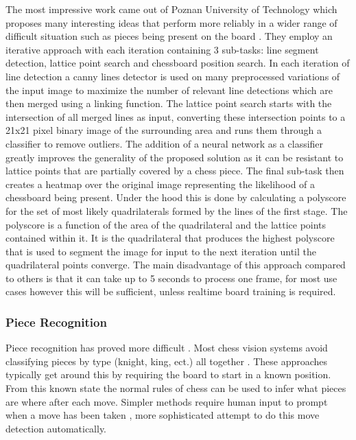 The most impressive work came out of Poznan University of Technology which proposes many interesting ideas that perform more 
reliably in a wider range of difficult situation such as pieces being present on the board \cite{}.  They employ an iterative 
approach with each iteration containing 3 sub-tasks: line segment detection, lattice point search and chessboard position search.
In each iteration of line detection a canny lines detector \cite{} is used on many preprocessed variations of the input image 
to maximize the number of relevant line detections which are then merged using a linking function. The lattice point search starts with 
the intersection of all merged lines as input, converting these intersection points to a 21x21 pixel binary image of the surrounding area and 
runs them through a classifier to remove outliers.  The addition of a neural network as a classifier greatly improves 
the generality of the proposed solution as it can be resistant to lattice points that are partially covered by a chess piece.
The final sub-task then creates a heatmap over the original image representing the likelihood of a chessboard being present.  
Under the hood this is done by calculating a polyscore for the set of most likely quadrilaterals formed by the lines of the first stage.
The polyscore is a function of the area of the quadrilateral and the lattice points contained within it.
It is the quadrilateral that produces the highest polyscore that is used to segment the image for input to the next iteration until the quadrilateral
points converge.  The main disadvantage of this approach compared to others is that it can take up to 5 seconds to process one frame, 
for most use cases however this will be sufficient, unless realtime board training is required.

\subsubsection{Piece Recognition}

Piece recognition has proved more difficult \cite{}.  Most chess vision systems avoid classifying pieces by 
type (knight, king, ect.) all together \cite{}.  These approaches typically get around this by requiring the board to start in a known position.
From this known state the normal rules of chess can be used to infer what pieces are where after each move.  Simpler methods
require human input to prompt when a move has been taken \cite{}, more sophisticated attempt to do this move detection automatically.

